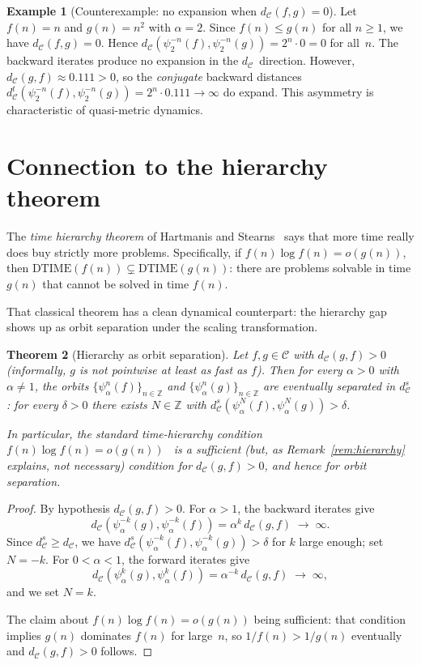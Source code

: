 \documentclass[11pt,a4paper]{article}
\theoremstyle{plain}
\newtheorem{theoreminner}{Theorem}[section]
\theoremstyle{definition}
\newtheorem{exampleinner}[theoreminner]{Example}
\newenvironment{theorem}[1][]{\begin{theoreminner}[#1]}{\end{theoreminner}}
\newenvironment{example}[1][]{\begin{exampleinner}[#1]}{\end{exampleinner}}
\newcommand{\Z}{\mathbb{Z}}
\newcommand{\C}{\mathcal{C}}
\begin{document}
\begin{example}[Counterexample: no expansion when $d_\C(f,g)=0$]
\label{ex:no-backward-exp}
Let $f(n)=n$ and $g(n)=n^2$ with $\alpha=2$.  Since $f(n)\le g(n)$
for all $n\ge 1$, we have $d_\C(f,g)=0$.  Hence
$d_\C(\psi_2^{-n}(f),\psi_2^{-n}(g))=2^n\cdot 0=0$ for all~$n$.
The backward iterates produce no expansion in the $d_\C$~direction.
However, $d_\C(g,f)\approx 0.111>0$, so the \emph{conjugate}
backward distances $d_\C^t(\psi_2^{-n}(f),\psi_2^{-n}(g))=2^n\cdot
0.111\to\infty$ do expand.  This asymmetry is characteristic of
quasi-metric dynamics.
\end{example}


\section{Connection to the hierarchy theorem}
\label{sec:hierarchy}

The \emph{time hierarchy theorem} of Hartmanis and
Stearns~\cite{hartmanis1965} says that more time really does buy
strictly more problems.  Specifically, if $f(n)\log f(n)=o(g(n))$,
then $\mathrm{DTIME}(f(n))\subsetneq\mathrm{DTIME}(g(n))$: there
are problems solvable in time $g(n)$ that cannot be solved in
time $f(n)$.

That classical theorem has a clean dynamical counterpart: the
hierarchy gap shows up as orbit separation under the scaling
transformation.

\begin{theorem}[Hierarchy as orbit separation]\label{thm:hierarchy}
Let $f,g\in\C$ with $d_\C(g,f)>0$ (informally, $g$ is not pointwise
at least as fast as $f$).  Then for every $\alpha>0$ with
$\alpha\ne 1$, the orbits $\{\psi_\alpha^n(f)\}_{n\in\Z}$ and
$\{\psi_\alpha^n(g)\}_{n\in\Z}$ are eventually separated in
$d_\C^s$: for every $\delta>0$ there exists $N\in\Z$ with
$d_\C^s(\psi_\alpha^N(f),\psi_\alpha^N(g))>\delta$.

In particular, the standard time-hierarchy condition
$f(n)\log f(n)=o(g(n))$~\cite{hartmanis1965} is a sufficient
(but, as Remark~\ref{rem:hierarchy} explains, not necessary)
condition for $d_\C(g,f)>0$, and hence for orbit separation.
\end{theorem}

\begin{proof}
By hypothesis $d_\C(g,f)>0$.  For $\alpha>1$, the backward iterates give
\[
  d_\C(\psi_\alpha^{-k}(g),\psi_\alpha^{-k}(f))
  = \alpha^k\,d_\C(g,f) \;\to\;\infty.
\]
Since $d_\C^s\ge d_\C$, we have
$d_\C^s(\psi_\alpha^{-k}(f),\psi_\alpha^{-k}(g))>\delta$ for
$k$ large enough; set $N=-k$.  For $0<\alpha<1$, the forward iterates give
\[
  d_\C(\psi_\alpha^k(g),\psi_\alpha^k(f))
  = \alpha^{-k}\,d_\C(g,f) \;\to\;\infty,
\]
and we set $N=k$.

The claim about $f(n)\log f(n)=o(g(n))$ being sufficient: that
condition implies $g(n)$ dominates $f(n)$ for large~$n$, so
$1/f(n)>1/g(n)$ eventually and $d_\C(g,f)>0$ follows.
\end{proof}
\end{document}
